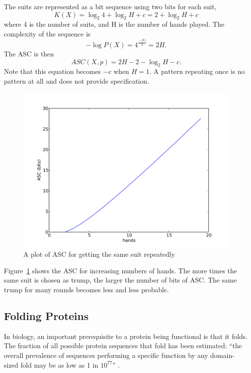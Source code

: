 The suits are represented as a bit sequence using two bits for each suit,
\begin{equation}
    K(X) = \log_2 4 + \log_2 H + c = 2 + \log_2 H + c
\end{equation} where 4 is the number of suits, and H is the number of hands played.
The complexity of the sequence is 
\begin{equation}
    -\log P(X) = 4^\frac{-|X|}{2} = 2H \mbox{.}
\end{equation}
The ASC is then
\begin{equation}
    ASC(X,p) = 2H - 2 - \log_2 H - c \mbox{.}
\end{equation}
Note that this equation becomes $-c$ when $H=1$.
A pattern repeating once is no pattern at all and does not provide specification.
\begin{figure}[H]
    \includegraphics[width=\textwidth]{EwertRepeatPng.png}
    \caption{A plot of ASC for getting the same suit repeatedly}
    \label{suit.plot}
\end{figure}
Figure~\ref{suit.plot} shows the ASC for increasing numbers of hands.
The more times the same suit is chosen as trump, the larger the number of bits of ASC.
The same trump for many rounds becomes less and less probable.

\subsection{Folding Proteins}
\label{sec_folding}

In biology, an important prerequisite to a protein being functional is that it folds.
The fraction of all possible protein sequences that fold has been estimated: ``the overall prevalence of sequences performing a specific function by any domain-sized fold may be as low as 1 in $10^{77}$'' \citep{axe2004}.


